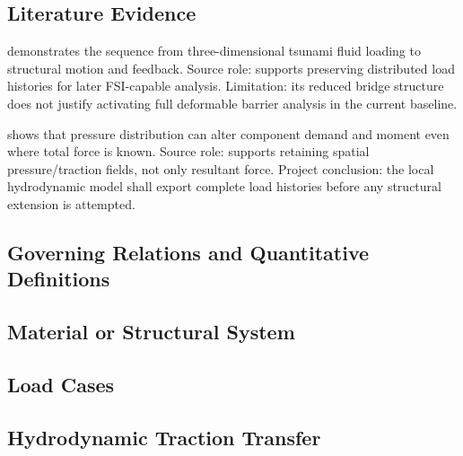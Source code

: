 \subsection{Literature Evidence}
\label{sec:res-str-lod-literature-evidence}

\textcite{baragamage2024fullycoupled} demonstrates the sequence from
three-dimensional tsunami fluid loading to structural motion and
feedback. Source role: supports preserving distributed load histories
for later FSI-capable analysis. Limitation: its reduced bridge
structure does not justify activating full deformable barrier analysis
in the current baseline.

\textcite{istrati2019trappedair} shows that pressure distribution can
alter component demand and moment even where total force is known.
Source role: supports retaining spatial pressure/traction fields, not
only resultant force. Project conclusion: the local hydrodynamic model
shall export complete load histories before any structural extension is
attempted.

\subsection{Governing Relations and Quantitative Definitions}
\label{sec:res-str-lod-governing-relations}

%

\subsection{Material or Structural System}
\label{sec:res-str-lod-material-structural-system}


\subsection{Load Cases}
\label{sec:res-str-lod-load-cases}


\subsection{Hydrodynamic Traction Transfer}
\label{subsec:res_str_lod_hydrodynamic_traction_transfer}

